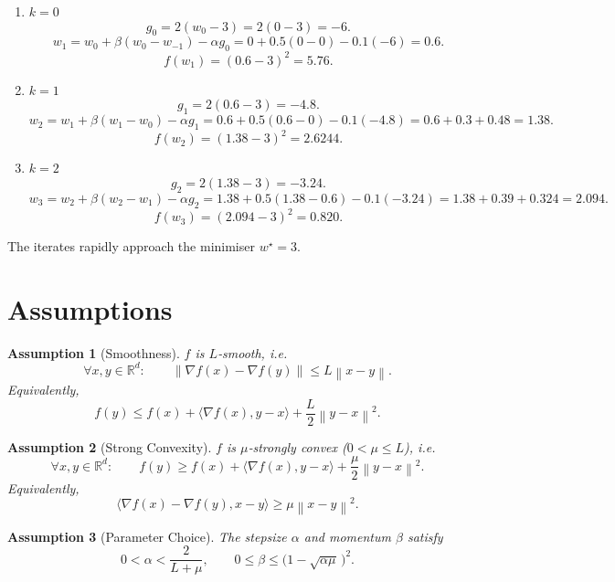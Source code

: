 \documentclass[11pt]{article}
\newtheorem{assumption}{Assumption}
\newcommand{\norm}[1]{\left\lVert#1\right\rVert}
\newcommand{\R}{\mathbb{R}}
\begin{document}
\begin{enumerate}[label=Iteration \arabic*:, leftmargin=2.5cm]
\item $k=0$  
\[
g_{0}=2(w_{0}-3)=2(0-3)=-6.
\]
\[
w_{1}=w_{0}+\beta(w_{0}-w_{-1})-\alpha g_{0}=0+0.5(0-0)-0.1(-6)=0.6.
\]
\[
f(w_{1})=(0.6-3)^{2}=5.76.
\]

\item $k=1$  
\[
g_{1}=2(0.6-3)=-4.8.
\]
\[
w_{2}=w_{1}+\beta(w_{1}-w_{0})-\alpha g_{1}=0.6+0.5(0.6-0)-0.1(-4.8)=0.6+0.3+0.48=1.38.
\]
\[
f(w_{2})=(1.38-3)^{2}=2.6244.
\]

\item $k=2$  
\[
g_{2}=2(1.38-3)=-3.24.
\]
\[
w_{3}=w_{2}+\beta(w_{2}-w_{1})-\alpha g_{2}
      =1.38+0.5(1.38-0.6)-0.1(-3.24)
      =1.38+0.39+0.324=2.094.
\]
\[
f(w_{3})=(2.094-3)^{2}=0.820.
\]
\end{enumerate}
The iterates rapidly approach the minimiser $w^{\star}=3$.

\newpage
\section*{Assumptions}
\begin{assumption}[Smoothness]\label{as:smooth}
$f$ is $L$‑smooth, i.e.
\[
\forall x,y\in\R^{d}:\qquad 
\norm{\nabla f(x)-\nabla f(y)}\le L\norm{x-y}.
\tag{A1}
\]
Equivalently,
\[
f(y)\le f(x)+\langle\nabla f(x),y-x\rangle+\frac{L}{2}\norm{y-x}^{2}.
\tag{A1'}
\]
\end{assumption}

\begin{assumption}[Strong Convexity]\label{as:strong}
$f$ is $\mu$‑strongly convex ($0<\mu\le L$), i.e.
\[
\forall x,y\in\R^{d}:\qquad 
f(y)\ge f(x)+\langle\nabla f(x),y-x\rangle+\frac{\mu}{2}\norm{y-x}^{2}.
\tag{A2}
\]
Equivalently,
\[
\langle\nabla f(x)-\nabla f(y),x-y\rangle\ge\mu\norm{x-y}^{2}.
\tag{A2'}
\]
\end{assumption}

\begin{assumption}[Parameter Choice]\label{as:param}
The stepsize $\alpha$ and momentum $\beta$ satisfy
\[
0<\alpha<\frac{2}{L+\mu},\qquad
0\le\beta\le\bigl(1-\sqrt{\alpha\mu}\,\bigr)^{2}.
\tag{A3}
\]
\end{assumption}
\end{document}
